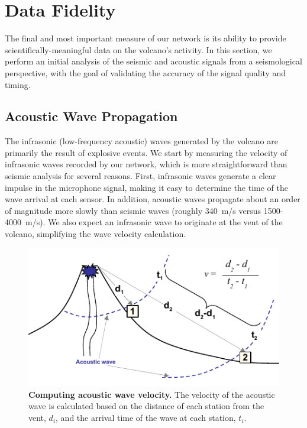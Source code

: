 \section{Data Fidelity}
\label{evaluation-sec-fidelity}

The final and most important measure of our network is its ability to provide
scientifically-meaningful data on the volcano's activity. In this section, we
perform an initial analysis of the seismic and acoustic signals from a
seismological perspective, with the goal of validating the accuracy of the
signal quality and timing.

\subsection{Acoustic Wave Propagation}

The infrasonic (low-frequency acoustic) waves generated by the volcano are
primarily the result of explosive events. We start by measuring the velocity
of infrasonic waves recorded by our network, which is more straightforward
than seismic analysis for several reasons. First, infrasonic waves generate a
clear impulse in the microphone signal, making it easy to determine the time
of the wave arrival at each sensor. In addition, acoustic waves propagate
about an order of magnitude more slowly than seismic waves (roughly 340~m/s
versus 1500-4000~m/s). We also expect an infrasonic wave to originate at the
vent of the volcano, simplifying the wave velocity calculation.

\begin{figure}[t]
\begin{center}
\includegraphics[width=\hsize]{./3-evaluation/figs/acousticsketch.pdf}
\end{center}

\caption{\textbf{Computing acoustic wave velocity.} The velocity of the
acoustic wave is calculated based on the distance of each station from the
vent, $d_i$, and the arrival time of the wave at each station, $t_i$.}

\label{evaluation-fig-acousticsketch}
\end{figure}


